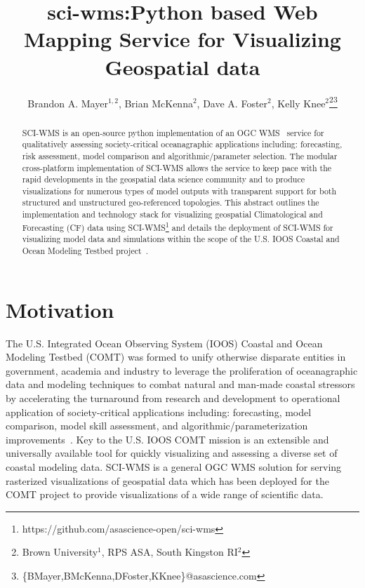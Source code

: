 \documentclass[11pt,twocolumn,twoside]{IEEEtran}
\newcommand{\comt}{COMT}
\newcommand{\ioos}{IOOS}
\newcommand{\ogc}{OGC}
\newcommand{\wms}{WMS}
\newcommand{\sciwms}{SCI-WMS}
\begin{document}
\title{\vspace{0.2in}\sc sci-wms:Python based Web Mapping Service for Visualizing Geospatial data}


\author{Brandon A. Mayer$^{1,2}$, Brian McKenna$^{2}$, Dave A. Foster$^{2}$, Kelly Knee$^{2}$\thanks{Brown University$^{1}$, RPS ASA, South Kingston RI$^{2}$}\thanks{\{BMayer,BMcKenna,DFoster,KKnee\}@asascience.com}}

\maketitle
\thispagestyle{fancy}

\begin{abstract}
\sciwms{} is an open-source python implementation of an \ogc{}
\wms{}~\cite{wms14} service for qualitatively assessing
society-critical oceanagraphic applications including: forecasting,
risk assessment, model comparison and algorithmic/parameter
selection. The modular cross-platform implementation of \sciwms{}
allows the service to keep pace with the rapid developments in the
geospatial data science community and to produce visualizations for
numerous types of model outputs with transparent support for both
structured and unstructured geo-referenced topologies. This abstract
outlines the implementation and technology stack for visualizing
geospatial Climatological and Forecasting (CF) data using
\sciwms{}\footnote{https://github.com/asascience-open/sci-wms} and
details the deployment of \sciwms{} for visualizing model data and
simulations within the scope of the U.S. \ioos{} Coastal and Ocean
Modeling Testbed project~\cite{luettich13}.
\end{abstract}

\section{Motivation}
The U.S. Integrated Ocean Observing System (\ioos{}) Coastal and Ocean
Modeling Testbed (\comt{}) was formed to unify otherwise disparate
entities in government, academia and industry to leverage the
proliferation of oceanagraphic data and modeling techniques to combat
natural and man-made coastal stressors by accelerating the turnaround
from research and development to operational application of
society-critical applications including: forecasting, model
comparison, model skill assessment, and algorithmic/parameterization
improvements~\cite{luettich13}. Key to the U.S. \ioos{} \comt{}
mission is an extensible and universally available tool for quickly
visualizing and assessing a diverse set of coastal modeling
data. \sciwms{} is a general \ogc{} \wms{} solution for serving
rasterized visualizations of geospatial data which has been deployed
for the \comt{} project to provide visualizations of a wide range of
scientific data.
\end{document}
